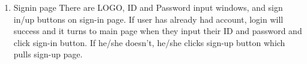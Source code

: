 \begin{enumerate}[label=\arabic*.]
\begin{enumerate}[label*={\arabic*.},ref=\theenumi.\arabic*]
                \item Signin page
                    There are LOGO, ID and Password input windows, and sign in/up buttons on sign-in page. If user has already had account, login will success and it turns to main page when they input their ID and password and click sign-in button. If he/she doesn't, he/she clicks sign-up button which pulls sign-up page.\\\\


\end{enumerate}
\end{enumerate}
